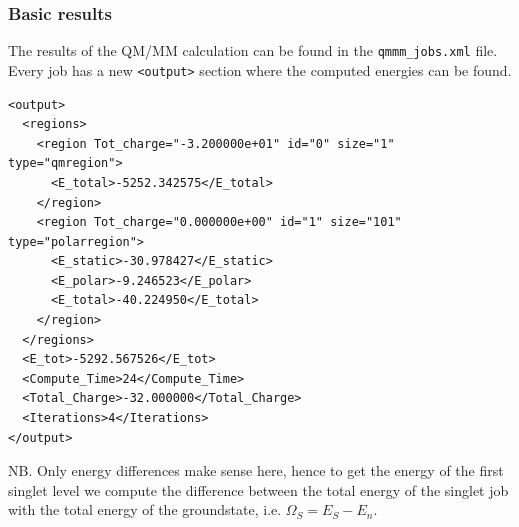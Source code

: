 \documentclass[t,aspectratio=169, 8pt]{beamer}
\begin{document}
\begin{frame}[fragile]
  \frametitle{Basic results}
  The results of the QM/MM calculation can be found in the \texttt{qmmm_jobs.xml} file.
  \vspace{0.1cm}\\
  Every job has a new \texttt{<output>} section where the computed energies can be found.
  \begin{verbatim}
<output>
  <regions>
    <region Tot_charge="-3.200000e+01" id="0" size="1" type="qmregion">
      <E_total>-5252.342575</E_total>
    </region>
    <region Tot_charge="0.000000e+00" id="1" size="101" type="polarregion">
      <E_static>-30.978427</E_static>
      <E_polar>-9.246523</E_polar>
      <E_total>-40.224950</E_total>
    </region>
  </regions>
  <E_tot>-5292.567526</E_tot>
  <Compute_Time>24</Compute_Time>
  <Total_Charge>-32.000000</Total_Charge>
  <Iterations>4</Iterations>
</output>
  \end{verbatim}
\small
NB. Only energy differences make sense here, hence to get the energy of the first singlet level we compute the difference between the total energy of the singlet job with the total energy of the groundstate, i.e. $\Omega_S = E_S - E_n$.
\end{frame}
\end{document}
